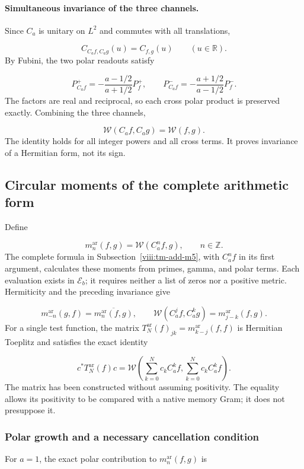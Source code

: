 \paragraph{Simultaneous invariance of the three channels.}
\label{viii:tm-add:invariancia-weil} Since \(C_a\) is unitary on \(L^2\) and commutes with all translations,

\[
C_{C_af,C_ag}(u)=C_{f,g}(u)\qquad(u\in\mathbb R).
\]
By Fubini, the two polar readouts satisfy

\[
P_{C_af}^+=-\frac{a-1/2}{a+1/2}P_f^+,
\qquad
P_{C_af}^-=-\frac{a+1/2}{a-1/2}P_f^-.
\]
The factors are real and reciprocal, so each cross polar product is preserved exactly. Combining the three channels,

\[
\boxed{\mathscr W(C_af,C_ag)=\mathscr W(f,g).}
\]
The identity holds for all integer powers and all cross terms. It proves invariance of a Hermitian form, not its sign.


\subsection{Circular moments of the complete arithmetic form}
\label{viii:tm-add-m6}
Define

\[
m_n^{\mathrm{ar}}(f,g)=\mathscr W(C_a^n f,g),\qquad n\in\mathbb Z.
\]
The complete formula in Subsection~\ref{viii:tm-add-m5}, with \(C_a^nf\) in its first argument, calculates these moments from primes, gamma, and polar terms. Each evaluation exists in \(\mathscr E_b\); it requires neither a list of zeros nor a positive metric. Hermiticity and the preceding invariance give

\[
m_{-n}^{\mathrm{ar}}(g,f)=\overline{m_n^{\mathrm{ar}}(f,g)},\qquad
\mathscr W(C_a^j f,C_a^k g)=m_{j-k}^{\mathrm{ar}}(f,g).
\]
For a single test function, the matrix \(T_N^{\mathrm{ar}}(f)_{jk}=m_{k-j}^{\mathrm{ar}}(f,f)\) is Hermitian Toeplitz and satisfies the exact identity

\[
c^*T_N^{\mathrm{ar}}(f)c
=\mathscr W\!\left(\sum_{k=0}^N c_k C_a^k f,
                    \sum_{k=0}^N c_k C_a^k f\right).
\]
The matrix has been constructed without assuming positivity. The equality allows its positivity to be compared with a native memory Gram; it does not presuppose it.


\subsubsection{Polar growth and a necessary cancellation condition}
\label{viii:tm-add-m6-1}
For \(a=1\), the exact polar contribution to \(m_n^{\mathrm{ar}}(f,g)\) is

